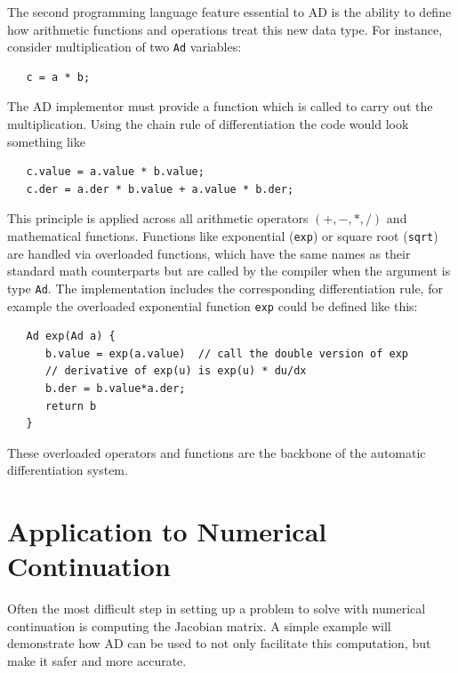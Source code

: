 \documentclass[10pt,openany,twoside]{book}
\numberwithin{equation}{section}   %
\newcommand{\Code}[1]{{\small\tt #1}}
\begin{document}
The second programming language feature essential to AD is
the ability to define how arithmetic functions and operations treat this
new data type.
For instance, consider multiplication of two \Code{Ad} variables:
\begin{lstlisting}
   c = a * b;
\end{lstlisting}
The AD implementor must provide a function which is called to carry out
the multiplication. Using the chain rule of differentiation the code
would look something like
\begin{lstlisting}
   c.value = a.value * b.value;
   c.der = a.der * b.value + a.value * b.der;
\end{lstlisting}
This principle is applied across all arithmetic operators $(+,-,*,/)$
and mathematical functions. Functions like exponential (\Code{exp})
or square root (\Code{sqrt}) are handled via overloaded functions,
which have the same names as their standard math counterparts but
are called by the compiler when the argument is type \Code{Ad}.
The implementation includes the corresponding differentiation rule,
for example the overloaded exponential function \Code{exp}
could be defined like this:
\begin{lstlisting}
   Ad exp(Ad a) {
      b.value = exp(a.value)  // call the double version of exp
      // derivative of exp(u) is exp(u) * du/dx
      b.der = b.value*a.der;
      return b
   }
\end{lstlisting}
These overloaded operators and functions are the backbone of the
automatic differentiation system.

\section{Application to Numerical Continuation}\label{sect:AD-impl}
Often the most difficult step in setting up a problem to solve
with numerical continuation is computing the Jacobian matrix.
A simple example will demonstrate how AD can be used to not only
facilitate this computation, but make it safer and more accurate.
\end{document}
